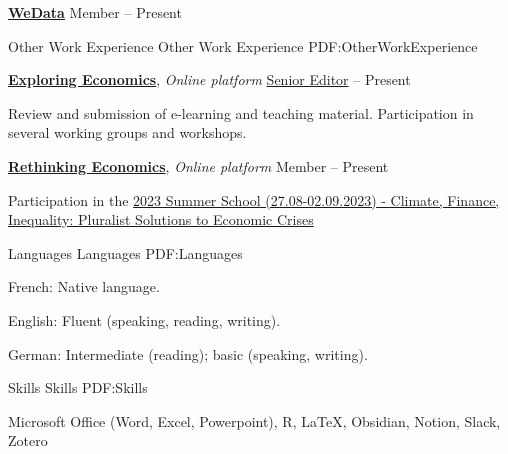 \documentclass[letterpaper,MMMyyyy,nonstopmode]{simpleresumecv}
\begin{document}
\begin{Body}
\begin{Detail}
\end{Detail}

\Entry
\href{https://wedata.ch/}
{\textbf{WeData}}
\Gap
\BulletItem
Member
\hfill
{} --
Present


\Section
{Other Work\newline
Experience}
{Other Work Experience}
{PDF:OtherWorkExperience}

\Entry
\href{https://www.exploring-economics.org/en/}
{\textbf{Exploring Economics}},
\textit{Online platform}
\BulletItem
\href{https://www.exploring-economics.org/fr/accounts/profile/1fb2f553-14fb-4227-b1e8-a14f2f2a1b6c/}
{Senior Editor}
\hfill
{} --
Present
\begin{Detail}
\SubBulletItem
Review and submission of e-learning and teaching material.  
\SubBulletItem
Participation in several working groups and workshops.  
\end{Detail}

\Entry
\href{https://www.rethinkeconomics.org/}
{\textbf{Rethinking Economics}},
\textit{Online platform}
\BulletItem
Member
\hfill
{} --
Present
\begin{Detail}
\SubBulletItem
Participation in the \href{https://www.swissrethinkeconomics.org/re-groups/plurale-okonomik-zurich/summer-school-2023/}{2023 Summer School (27.08-02.09.2023) - Climate, Finance, Inequality: Pluralist Solutions to Economic Crises}
\end{Detail}


\Section
{Languages}
{Languages}
{PDF:Languages}

\BulletItem
French: Native language.

\Gap
\BulletItem
English: Fluent (speaking, reading, writing).

\Gap
\BulletItem
German: Intermediate (reading); basic (speaking, writing).



\Section
{Skills}
{Skills}
{PDF:Skills}

\Entry
Microsoft Office (Word, Excel, Powerpoint), R, LaTeX, Obsidian, Notion, Slack, Zotero



\end{Body}
\end{document}
